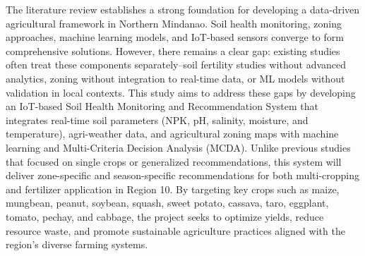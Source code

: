 {The literature review establishes a strong foundation for developing a data-driven agricultural framework in Northern Mindanao. Soil health monitoring, zoning approaches, machine learning models, and IoT-based sensors converge to form comprehensive solutions. However, there remains a clear gap: existing studies often treat these components separately–soil fertility studies without advanced analytics, zoning without integration to real-time data, or ML models without validation in local contexts. This study aims to address these gaps by developing an IoT-based Soil Health Monitoring and Recommendation System that integrates real-time soil parameters (NPK, pH, salinity, moisture, and temperature), agri-weather data, and agricultural zoning maps with machine learning and Multi-Criteria Decision Analysis (MCDA). Unlike previous studies that focused on single crops or generalized recommendations, this system will deliver zone-specific and season-specific recommendations for both multi-cropping and fertilizer application in Region 10. By targeting key crops such as maize, mungbean, peanut, soybean, squash, sweet potato, cassava, taro, eggplant, tomato, pechay, and cabbage, the project seeks to optimize yields, reduce resource waste, and promote sustainable agriculture practices aligned with the region’s diverse farming systems.

}